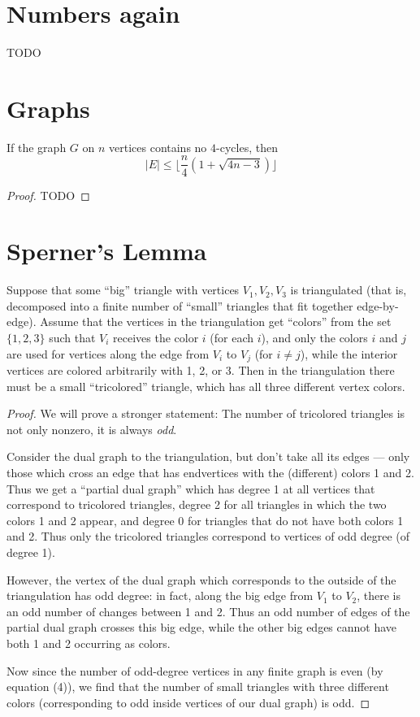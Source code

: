 \section{Numbers again}
 TODO

\section{Graphs}
\begin{theorem}
  \label{ch28theorem}
  If the graph $G$ on $n$ vertices contains no $4$-cycles, then
  \[
  |E| \le \lfloor\frac{n}{4}(1 + \sqrt{4n - 3})\rfloor
  \]
\end{theorem}
\begin{proof}
  TODO
\end{proof}

\section{Sperner's Lemma}
\begin{lemma}
  \label{sperner}
  Suppose that some “big” triangle with vertices $V_1, V_2, V_3$ is triangulated (that is, decomposed into a finite number of “small” triangles that fit together edge-by-edge).
Assume that the vertices in the triangulation get “colors” from the set $\{1, 2, 3\}$ such that $V_i$ receives the color $i$ (for each $i$), and only the colors $i$ and $j$ are used for vertices along the edge from $V_i$ to $V_j$ (for $i \neq j$), while the interior vertices are colored arbitrarily with 1, 2, or 3.
Then in the triangulation there must be a small “tricolored” triangle, which has all three different vertex colors.
\end{lemma}
\begin{proof}
  We will prove a stronger statement: The number of tricolored triangles is not only nonzero,
  it is always \emph{odd}.

Consider the dual graph to the triangulation, but don’t take all its edges — only those which cross an edge that has endvertices with the (different) colors 1 and 2. Thus we get a “partial dual graph” which has degree 1 at all vertices that correspond to tricolored triangles, degree 2 for all triangles in which the two colors 1 and 2 appear, and degree 0 for triangles that do not have both colors 1 and 2. Thus only the tricolored triangles correspond to vertices of odd degree (of degree 1).

However, the vertex of the dual graph which corresponds to the outside of the triangulation has odd degree: in fact, along the big edge from $V_1$ to $V_2$, there is an odd number of changes between 1 and 2. Thus an odd number of edges of the partial dual graph crosses this big edge, while the other big edges cannot have both 1 and 2 occurring as colors.

Now since the number of odd-degree vertices in any finite graph is even (by equation (4)), we find that the number of small triangles with three different colors (corresponding to odd inside vertices of our dual graph) is odd.
\end{proof}

